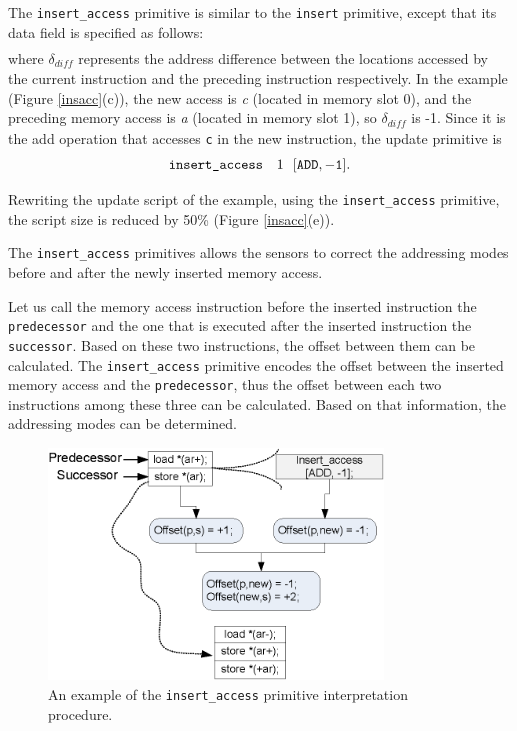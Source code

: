 The {\tt insert\_access} primitive is similar to the {\tt insert} primitive, except that its data field is specified as follows:
\begin{eqnarray}
[\textit{operation},\delta_{\textit{diff}}]\nonumber
\end{eqnarray}
where $\delta_{\textit{diff}}$ represents the address difference between the locations accessed by the current instruction and the preceding instruction respectively. In the example (Figure \ref{insacc}(c)), the new access is {\em c }(located in memory slot 0), and the preceding memory access is {\em a} (located in memory slot 1), so $\delta_{\textit{diff}}$ is -1.
Since it is the add operation that accesses {\tt c} in the new instruction, the update primitive is  
\begin{eqnarray}
 \texttt{insert\_access} ~~~1 ~~ [\tt{ADD}, -1].\nonumber
\end{eqnarray}

Rewriting the update script of the example, using the {\tt insert\_access} primitive, the script size is reduced by 50\% (Figure \ref{insacc}(e)). 

The {\tt insert\_access} primitives allows the sensors to correct the
addressing modes before and after the newly inserted memory access.

Let us call the memory access instruction before the inserted instruction the {\tt 
predecessor} and the one that is executed after the inserted instruction the
{\tt successor}.
Based on these two instructions, the offset between them can be calculated.
The {\tt insert\_access} primitive encodes the offset between the inserted
memory access and the {\tt predecessor}, thus the offset between each two 
instructions among these three can be calculated.
Based on that information, the addressing modes can be determined.

\begin{figure}[htbp]
\centering
\includegraphics[width=3.5in]{./figures/insert_access.eps}
\caption{An example of the {\tt insert\_access} primitive interpretation procedure.}
\label{insertaccess}
\end{figure}

